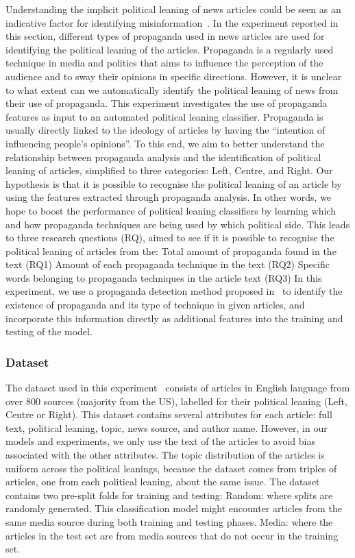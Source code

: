 Understanding the implicit political leaning of news articles could be seen as an indicative factor for identifying misinformation~\citep{spezzano2021s}. In the experiment reported in this section, different types of propaganda used in news articles are used for identifying the political leaning of the articles. 
Propaganda is a regularly used technique in media and politics that aims to influence the perception of the audience and to sway their opinions in specific directions. However, it is unclear to what extent can we automatically identify the political leaning of news from their use of propaganda. This experiment investigates the use of propaganda features as input to an automated political leaning classifier.
Propaganda is usually directly linked to the ideology of articles by having the “intention of influencing people’s opinions”. To this end, we aim to better understand the relationship between propaganda analysis and the identification of political leaning of articles, simplified to three categories: Left, Centre, and Right.
Our hypothesis is that it is possible to recognise the political leaning of an article by using the features extracted through propaganda analysis. In other words, we hope to boost the performance of political leaning classifiers by learning which and how propaganda techniques are being used by which political side. This leads to three research questions (RQ), aimed to see if it is possible to recognise the political leaning of articles from the:
Total amount of propaganda found in the text (RQ1)
Amount of each propaganda technique in the text (RQ2)
Specific words belonging to propaganda techniques in the article text (RQ3)
In this experiment, we use a propaganda detection method proposed in~\citet{da2019fine} to identify the existence of propaganda and its type of technique in given articles, and incorporate this information directly as additional features into the training and testing of the model.

\subsubsection{Dataset}
The dataset used in this experiment~\citep{baly2020we} consists of articles in English language from over 800 sources (majority from the US), labelled for their political leaning (Left, Centre or Right). This dataset contains several attributes for each article: full text, political leaning, topic, news source, and author name. However, in our models and experiments, we only use the text of the articles to avoid bias associated with the other attributes. The topic distribution of the articles is uniform across the political leanings, because the dataset comes from triples of articles, one from each political leaning, about the same issue. The dataset contains two pre-split folds for training and testing:
Random: where splits are randomly generated. This classification model might encounter articles from the same media source during both training and testing phases.
Media: where the articles in the test set are from media sources that do not occur in the training set.

